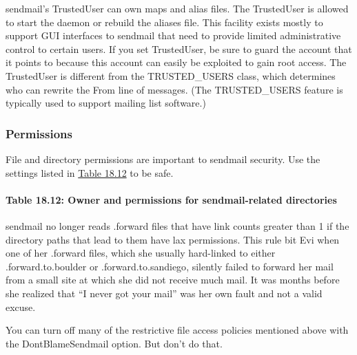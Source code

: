 {sendmail}'s {TrustedUser} can own maps and alias files. The
{TrustedUser} is allowed to start the daemon or rebuild the {aliases}
file. This facility exists mostly to support GUI interfaces to
{sendmail} that need to provide limited administrative control to
certain users. If you set {TrustedUser}, be sure to guard the account
that it points to because this account can easily be exploited to gain
root access. The {TrustedUser} is different from the {TRUSTED\_USERS}
class, which determines who can rewrite the From line of messages. (The
{TRUSTED\_USERS} feature is typically used to support mailing list
software.)

\subsubsection[Permissions]{\texorpdfstring{\protect\hypertarget{part0026_split_038.htmlux5cux23_idTextAnchor1103}{}{}Permissions}{Permissions}}

\protect\hypertarget{part0026_split_038.htmlux5cux23_idIndexMarker2582}{}{}File
and directory permissions are important to {sendmail} security. Use the
settings listed in
\protect\hyperlink{part0026_split_038.htmlux5cux23_idTextAnchor1104}{Table
18.12} to be safe.

\paragraph[{Table 18.12: }Owner and permissions for {sendmail}-related
directories]{\texorpdfstring{{Table 18.12:
}\protect\hypertarget{part0026_split_038.htmlux5cux23_idTextAnchor1104}{}{}\protect\hypertarget{part0026_split_038.htmlux5cux23_idTextAnchor1105}{}{}Owner
and permissions for {sendmail}-related
directories}{Table 18.12: Owner and permissions for sendmail-related directories}}


{sendmail} no longer reads
\protect\hypertarget{part0026_split_038.htmlux5cux23_idIndexMarker2583}{}{}{.forward}
files that have link counts greater than 1 if the directory paths that
lead to them have lax permissions. This rule bit Evi when one of her
{.forward} files, which she usually hard-linked to either
{.forward.to.boulder} or {.forward.to.sandiego}, silently failed to
forward her mail from a small site at which she did not receive much
mail. It was months before she realized that ``I never got your mail''
was her own fault and not a valid excuse.

You can turn off many of the restrictive file access policies mentioned
above with the {DontBlameSendmail} option. But don't do that.

